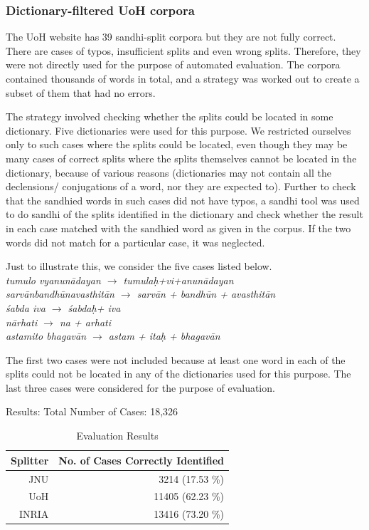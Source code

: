 \documentclass[11pt]{article}
\begin{document}
\subsubsection{Dictionary-filtered UoH corpora}
 The UoH website has 39 sandhi-split corpora but they are not fully correct. There are cases of typos, insufficient splits and even wrong splits. Therefore, they were not directly used for the purpose of automated evaluation. The corpora contained thousands of words in total, and a strategy was worked out to create a subset of them that had no errors.
 
The strategy involved checking whether the splits could be located in some dictionary. Five dictionaries were used for this purpose. We restricted ourselves only to such cases where the splits could be located, even though they may be many cases of correct splits where the splits themselves cannot be located in the dictionary, because of various reasons (dictionaries may not contain all the declensions/ conjugations of a word, nor they are expected to). Further to check that the sandhied words in such cases did not have typos, a sandhi tool was used to do sandhi of the splits identified in the dictionary and check whether the result in each case matched with the sandhied word as given in the corpus. If the two words did not match for a particular case, it was neglected.

Just to illustrate this, we consider the five cases listed below.\\
\textit{ tumulo vyanun\={a}dayan $\rightarrow$ tumula\d{h}+vi+anun\={a}dayan\\
sarv\={a}nbandh\={u}navasthit\={a}n $\rightarrow$ sarv\={a}n + bandh\={u}n + avasthit\={a}n\\
\'{s}abda iva $\rightarrow$ \'{s}abda\d{h}+  iva\\                                              
n\={a}rhati $\rightarrow$ na + arhati\\
astamito bhagav\={a}n $\rightarrow$ astam + ita\d{h} + bhagav\={a}n
}

The first two cases were not included because at least one word in each of the splits could not be located in any of the dictionaries used for this purpose. The last three cases were considered for the purpose of evaluation. 


Results:
Total Number of Cases: 18,326


\begin{table}[h]
\begin{center}
\begin{tabular}{| r | r | }
\hline  \bf Splitter & \bf No. of Cases Correctly Identified \\
\hline
JNU & 3214 (17.53 \%) \\
UoH & 11405 (62.23 \%) \\
INRIA & 13416 (73.20 \%)\\
\hline
\end{tabular}
\end{center}
\caption{\label{font-table} Evaluation Results }
\end{table}
\end{document}
